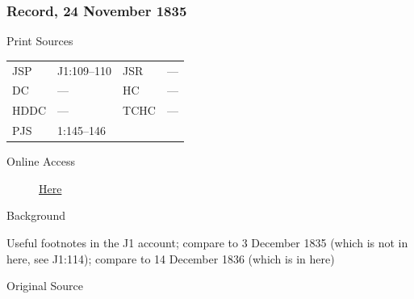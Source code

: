 		\subsubsection{Record, 24 November 1835}
			\label{EMS-1835-JS-24-NOV-1835}
			
			\begin{description}
				\item[Print Sources]
			\end{description}

				\begin{tabular}{p{0.5in}p{1in}p{0.5in}p{1in}}
				JSP	 	& J1:109--110		& JSR 		& --- \\
				DC	 	& --- 				& HC 		& --- \\
				HDDC 	& ---				& TCHC 		& --- \\
				PJS 	& 1:145--146			& 	 		&  \\
				\end{tabular}
			
			\begin{description}
				\item[Online Access] \href{https://www.josephsmithpapers.org/paper-summary/journal-1835-1836/50}{Here}
			\end{description}
			
			\begin{description}
				\item[Background]
			\end{description}
			
				
				Useful footnotes in the J1 account; compare to 3 December 1835 (which is not in here, see J1:114); compare to 14 December 1836 (which is in here)
			
			\begin{description}
				\item[Original Source]
			\end{description}
			
			
